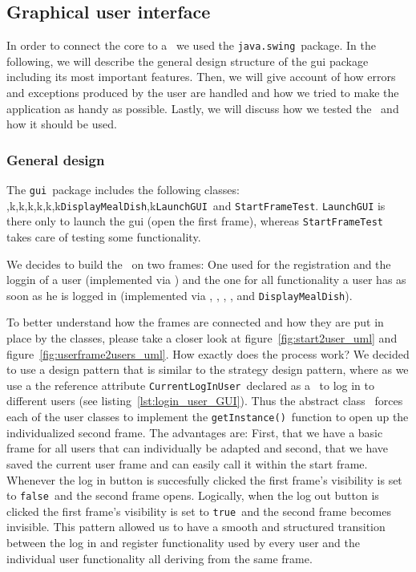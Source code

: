 \subsection{Graphical user interface} %
\label{sub:graphical_user_interface}

In order to connect the core to a \GUI~we used the \lstinline|java.swing|~package.
In the following, we will describe the general design structure of the gui package including 
its most important features. Then, we will give account of how errors and exceptions produced 
by the user are handled and how we tried to make the application as handy as possible. 
Lastly, we will discuss how we tested the \GUI~and how it should be used.

\subsubsection{General design} %
\label{ssub:general_design}

The \lstinline|gui|~package includes the following classes: 
\StFra,k\UserF,k\RestF,k\ManagF,k\CourF,k\CustF,k\lstinline|DisplayMealDish|,k\lstinline|LaunchGUI|~and 
\lstinline|StartFrameTest|. 
\lstinline|LaunchGUI| is there only to launch the gui (open the first frame), whereas 
\lstinline|StartFrameTest| takes care of testing some functionality.

We decides to build the \GUI~on two frames: One used for the registration and the loggin of a user
 (implemented via \StFra)
and the one for all functionality a user has as soon as he is logged in (implemented via  
\UserF, \RestF, \ManagF, \CourF, \CustF and \lstinline|DisplayMealDish|). 

To better understand how the frames are connected and how they are put in place by the classes, 
please take a closer look at figure~\ref{fig:start2user_uml} and figure~\ref{fig:userframe2users_uml}.
How exactly does the process work?
We decided to use a design pattern that is similar to the strategy design pattern, where as we use a 
the reference attribute \lstinline|CurrentLogInUser|~declared as a \UserF~to log in to different 
users (see listing~\ref{lst:login_user_GUI}). Thus the abstract class \UserF~forces each of the user 
classes to implement the \lstinline|getInstance()|~function to open up the individualized second frame. 
The advantages are: First, that we have a basic frame 
for all users that can individually be adapted and second, that we have saved the current user frame 
and can easily call it within the start frame. 
Whenever the log in button is succesfully clicked the first frame's visibility is set to 
\lstinline|false|~and the second frame opens. Logically, when the log out button is clicked the first 
frame's visibility is set to \lstinline|true|~and the second frame becomes invisible. 
This pattern allowed us to have a smooth and structured transition between the log in and register 
functionality used by every user and the individual user functionality all deriving from the same 
frame.

